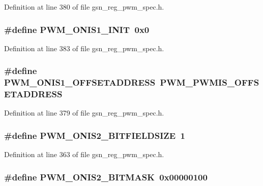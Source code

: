 Definition at line 380 of file gsn\_\-reg\_\-pwm\_\-spec.h.

\hypertarget{a00565_ab5bdc403d17f3c123eabba9ce9803144}{
\subsubsection[{PWM\_\-ONIS1\_\-INIT}]{\setlength{\rightskip}{0pt plus 5cm}\#define PWM\_\-ONIS1\_\-INIT~0x0}}
\label{a00565_ab5bdc403d17f3c123eabba9ce9803144}


Definition at line 383 of file gsn\_\-reg\_\-pwm\_\-spec.h.

\hypertarget{a00565_a64dafa81ad149352d3b96cdaf4df87ac}{
\subsubsection[{PWM\_\-ONIS1\_\-OFFSETADDRESS}]{\setlength{\rightskip}{0pt plus 5cm}\#define PWM\_\-ONIS1\_\-OFFSETADDRESS~PWM\_\-PWMIS\_\-OFFSETADDRESS}}
\label{a00565_a64dafa81ad149352d3b96cdaf4df87ac}


Definition at line 379 of file gsn\_\-reg\_\-pwm\_\-spec.h.

\hypertarget{a00565_aec621161c9287a2c020ec844e3e73692}{
\subsubsection[{PWM\_\-ONIS2\_\-BITFIELDSIZE}]{\setlength{\rightskip}{0pt plus 5cm}\#define PWM\_\-ONIS2\_\-BITFIELDSIZE~1}}
\label{a00565_aec621161c9287a2c020ec844e3e73692}


Definition at line 363 of file gsn\_\-reg\_\-pwm\_\-spec.h.

\hypertarget{a00565_a1dcc9a8438a604cb0897b0ed9ad04917}{
\subsubsection[{PWM\_\-ONIS2\_\-BITMASK}]{\setlength{\rightskip}{0pt plus 5cm}\#define PWM\_\-ONIS2\_\-BITMASK~0x00000100}}
\label{a00565_a1dcc9a8438a604cb0897b0ed9ad04917}


